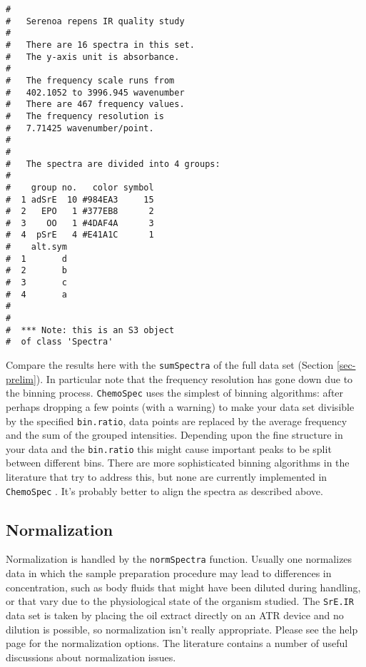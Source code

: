 \documentclass[letter,10pt,twocolumn,twoside,printwatermark=false]{pinp}
\begin{document}
\begin{ShadedResult}
\begin{verbatim}
#  
#   Serenoa repens IR quality study 
#  
#   There are 16 spectra in this set.
#   The y-axis unit is absorbance.
#  
#   The frequency scale runs from
#   402.1052 to 3996.945 wavenumber
#   There are 467 frequency values.
#   The frequency resolution is
#   7.71425 wavenumber/point.
#  
#  
#   The spectra are divided into 4 groups: 
#  
#    group no.   color symbol
#  1 adSrE  10 #984EA3     15
#  2   EPO   1 #377EB8      2
#  3    OO   1 #4DAF4A      3
#  4  pSrE   4 #E41A1C      1
#    alt.sym
#  1       d
#  2       b
#  3       c
#  4       a
#  
#  
#  *** Note: this is an S3 object
#  of class 'Spectra'
\end{verbatim}
\end{ShadedResult}

Compare the results here with the \texttt{sumSpectra} of the full data
set (Section \ref{sec-prelim}). In particular note that the frequency
resolution has gone down due to the binning process. \texttt{ChemoSpec}
uses the simplest of binning algorithms: after perhaps dropping a few
points (with a warning) to make your data set divisible by the specified
\texttt{bin.ratio}, data points are replaced by the average frequency
and the sum of the grouped intensities. Depending upon the fine
structure in your data and the \texttt{bin.ratio} this might cause
important peaks to be split between different bins. There are more
sophisticated binning algorithms in the literature that try to address
this, but none are currently implemented in \texttt{ChemoSpec}
\citep{Anderson2008, DeMeyer2008, Sousa2013}. It's probably better to
align the spectra as described above.

\hypertarget{normalization}{%
\subsection{Normalization}\label{normalization}}

Normalization is handled by the \texttt{normSpectra} function. Usually
one normalizes data in which the sample preparation procedure may lead
to differences in concentration, such as body fluids that might have
been diluted during handling, or that vary due to the physiological
state of the organism studied. The \texttt{SrE.IR} data set is taken by
placing the oil extract directly on an ATR device and no dilution is
possible, so normalization isn't really appropriate. Please see the help
page for the normalization options. The literature contains a number of
useful discussions about normalization
issues.\citep{Craig2006, Romano2000, vandenBerg2006, Filzmoser2009, Zhang2009}
\end{document}
